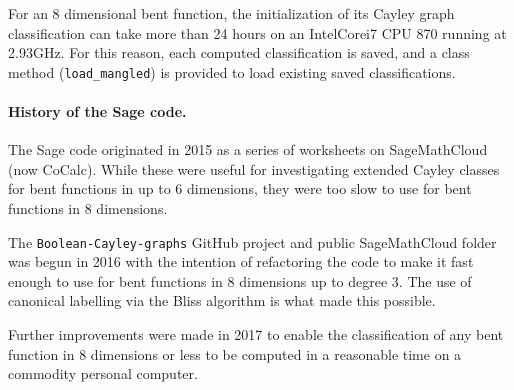 \documentclass[12pt,a4paper]{article}
\begin{document}
For an 8 dimensional bent function, the initialization of its Cayley graph classification
can take more than 24 hours on an Intel\textregistered Core\texttrademark i7 CPU 870 running at 2.93GHz.
For this reason, each computed classification is saved, and a class method (\texttt{load\_mangled})
is provided to load existing saved classifications.

\paragraph*{History of the Sage code.}

The Sage code originated in 2015 as a series of worksheets on Sage\-Math\-Cloud (now CoCalc).
While these were useful for investigating extended Cayley classes for bent functions in up to 6 dimensions,
they were too slow to use for bent functions in 8 dimensions.

The \texttt{Boolean-Cayley-graphs} GitHub project and public Sage\-Math\-Cloud folder was begun in 2016
with the intention of refactoring the code to make it fast enough to use for bent functions in 8 dimensions
up to degree 3.
The use of canonical labelling via the Bliss algorithm is what made this possible.

Further improvements were made in 2017 to enable the classification of any bent function in 8 dimensions or less
to be computed in a reasonable time on a commodity personal computer.
\end{document}

